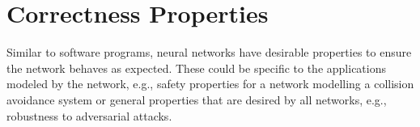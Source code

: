\documentclass[oneside,11pt,dvipsnames]{book}
\numberwithin{equation}{section}
\theoremstyle{definition}
\theoremstyle{remark}
\begin{document}














\chapter{Correctness Properties}

Similar to software programs, neural networks have desirable properties to ensure the network behaves as expected. These could be specific to the applications modeled by the network, e.g., safety properties for a network modelling a collision avoidance system or general properties that are desired by all networks, e.g., robustness to adversarial attacks. 
\end{document}
